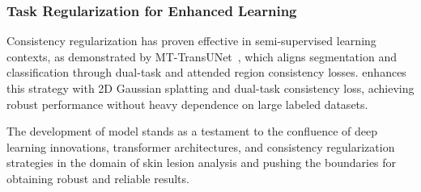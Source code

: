\subsubsection{Task Regularization for Enhanced Learning}
Consistency regularization has proven effective in semi-supervised learning contexts, as demonstrated by MT-TransUNet~\cite{dtc,robust}, which aligns segmentation and classification through dual-task and attended region consistency losses. \ours enhances this strategy with 2D Gaussian splatting and dual-task consistency loss, achieving robust performance without heavy dependence on large labeled datasets.

The development of \ours model stands as a testament to the confluence of deep learning innovations, transformer architectures, and consistency regularization strategies in the domain of skin lesion analysis and pushing the boundaries for obtaining robust and reliable results.

%